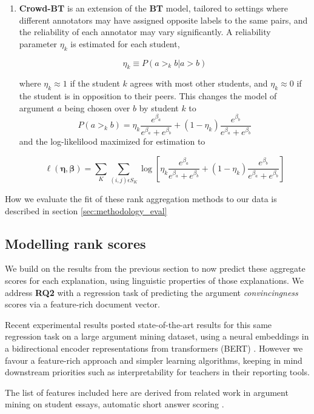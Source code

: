 \documentclass[notitlepage,12pt]{jedm}
\begin{document}
\begin{enumerate}
	\item \textbf{Crowd-BT} \cite{chen_pairwise_2013} is an extension of the 
	\textbf{BT} model, tailored to settings where different annotators may have 
	assigned opposite labels to the same pairs, and the reliability of each 
	annotator may vary significantly. 
	A reliability parameter $\eta_k$ is estimated for each student, 
	
	$$
	\eta_k \equiv P(a >_k b | a >b )
	$$
	
	where $\eta_k \approx 1$ if the student  $k$ agrees with most other 
	students, and $\eta_k \approx 0$ if the student is in opposition to their 
	peers.
	This changes the model of argument $a$ being chosen over $b$ by student $k$ 
	to 
	$$
	P(a >_k b) = 
	\eta_k \frac{e^{\beta_a}}{e^{\beta_a}+e^{\beta_b}} + (1-\eta_k) 
	\frac{e^{\beta_b}}{e^{\beta_a}+e^{\beta_b}}
	$$
	and the log-likelilood maximized for estimation to 
	
	$$
	\ell(\boldsymbol{\eta},\boldsymbol{\beta})=\sum_{K}\sum_{(i,j)\epsilon 
		S_K}^{} 
	\log \left[ \eta_k \frac{e^{\beta_a}}{e^{\beta_a}+e^{\beta_b}} + (1-\eta_k) 
	\frac{e^{\beta_b}}{e^{\beta_a}+e^{\beta_b}} \right]
	$$
	
\end{enumerate}

How we evaluate the fit of these rank aggregation methods to our data is 
described in section \ref{sec:methodology_eval}

\subsection{Modelling rank scores}\label{sec:features}
We build on the results from the previous section to now predict these 
aggregate scores for each explanation, using linguistic properties of those 
explanations.
We address \textbf{RQ2} with a regression task of predicting the argument 
\textit{convincingness} scores via a feature-rich document vector.

Recent experimental results posted state-of-the-art results for this same 
regression task on a large argument mining dataset, using a neural embeddings 
in a bidirectional encoder representations from transformers (BERT) 
\cite{gretz_large-scale_2019}.
However we favour a feature-rich approach and simpler learning algorithms, 
keeping in mind downstream priorities such as interpretability for teachers in 
their reporting tools.

The list of features included here are derived from related work in argument 
mining \cite{habernal_which_2016}\cite{persing_end--end_2016} on student 
essays, automatic short answer scoring \cite{mohler_text--text_2009}.
\end{document}

